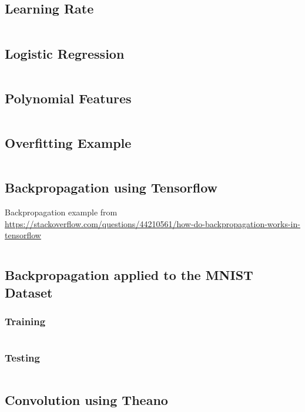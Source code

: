 \documentclass[a4paper,twoside,10pt]{article}
\begin{document}
\subsection{Learning Rate}\label{app:alphas}
\inputminted[frame=lines,linenos,fontsize=\small]{python}{learning_rate.py}

\subsection{Logistic Regression}\label{app:classifier}
\inputminted[frame=lines,linenos,fontsize=\small]{python}{classifier.py}

\subsection{Polynomial Features}\label{app:polynomial}
\inputminted[frame=lines,linenos,fontsize=\small]{python}{polynomial.py}

\subsection{Overfitting Example}\label{app:overfitting}
\inputminted[frame=lines,linenos,fontsize=\small]{python}{overfitting.py}

\subsection{Backpropagation using Tensorflow}\label{app:backprop}
Backpropagation example from \url{https://stackoverflow.com/questions/44210561/how-do-backpropagation-works-in-tensorflow}
\inputminted[frame=lines,linenos,fontsize=\small]{python}{backprop.py}

\subsection{Backpropagation applied to the MNIST Dataset}\label{app:mnistbackprop}
\subsubsection{Training}
\inputminted[frame=lines,linenos,fontsize=\small]{python}{mnist-backprop.py}
\subsubsection{Testing}
\inputminted[frame=lines,linenos,fontsize=\small]{python}{mnist-run.py}

\subsection{Convolution using Theano}
\inputminted[frame=lines,linenos,fontsize=\small]{python}{convolution.py}
\end{document}
